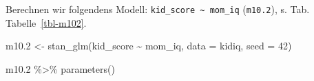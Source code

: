 \documentclass[
  a4paper,
  DIV=11]{scrreprt}
\newenvironment{Shaded}{\begin{snugshade}}{\end{snugshade}}
\newcommand{\AttributeTok}[1]{\textcolor[rgb]{0.40,0.45,0.13}{#1}}
\newcommand{\DecValTok}[1]{\textcolor[rgb]{0.68,0.00,0.00}{#1}}
\newcommand{\FloatTok}[1]{\textcolor[rgb]{0.68,0.00,0.00}{#1}}
\newcommand{\FunctionTok}[1]{\textcolor[rgb]{0.28,0.35,0.67}{#1}}
\newcommand{\NormalTok}[1]{\textcolor[rgb]{0.00,0.23,0.31}{#1}}
\newcommand{\OtherTok}[1]{\textcolor[rgb]{0.00,0.23,0.31}{#1}}
\newcommand{\SpecialCharTok}[1]{\textcolor[rgb]{0.37,0.37,0.37}{#1}}
\theoremstyle{definition}
\theoremstyle{remark}
\begin{document}
Berechnen wir folgendens Modell:
\texttt{kid\_score\ \textasciitilde{}\ mom\_iq} (\texttt{m10.2}), s.
Tab. Tabelle~\ref{tbl-m102}.

\begin{Shaded}
\begin{Highlighting}[]
\NormalTok{m10}\FloatTok{.2} \OtherTok{\textless{}{-}}
  \FunctionTok{stan\_glm}\NormalTok{(kid\_score }\SpecialCharTok{\textasciitilde{}}\NormalTok{ mom\_iq, }\AttributeTok{data =}\NormalTok{ kidiq, }\AttributeTok{seed =} \DecValTok{42}\NormalTok{)}

\NormalTok{m10}\FloatTok{.2} \SpecialCharTok{\%\textgreater{}\%} 
  \FunctionTok{parameters}\NormalTok{()}
\end{Highlighting}
\end{Shaded}

\hypertarget{tbl-m102}{}
\end{document}
